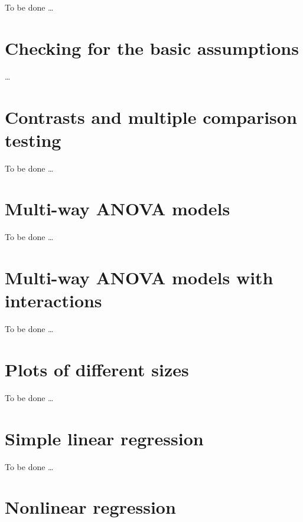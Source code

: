 \documentclass[a4paper,12pt,oneside]{book}
\begin{document}
To be done \ldots{}

\hypertarget{checking-for-the-basic-assumptions}{%
\chapter{Checking for the basic assumptions}\label{checking-for-the-basic-assumptions}}

\ldots{}

\hypertarget{contrasts-and-multiple-comparison-testing}{%
\chapter{Contrasts and multiple comparison testing}\label{contrasts-and-multiple-comparison-testing}}

To be done \ldots{}

\hypertarget{multi-way-anova-models}{%
\chapter{Multi-way ANOVA models}\label{multi-way-anova-models}}

To be done \ldots{}

\hypertarget{multi-way-anova-models-with-interactions}{%
\chapter{Multi-way ANOVA models with interactions}\label{multi-way-anova-models-with-interactions}}

To be done \ldots{}

\hypertarget{plots-of-different-sizes}{%
\chapter{Plots of different sizes}\label{plots-of-different-sizes}}

To be done \ldots{}

\hypertarget{simple-linear-regression}{%
\chapter{Simple linear regression}\label{simple-linear-regression}}

To be done \ldots{}

\hypertarget{nonlinear-regression}{%
\chapter{Nonlinear regression}\label{nonlinear-regression}}
\end{document}
